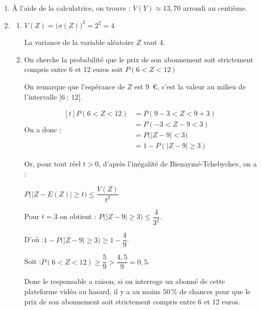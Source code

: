 \begin{enumerate}
\item À l'aide de la calculatrice, on trouve : $V(Y) \approx 13,70$ arrondi au centième.


\item
	\begin{enumerate}
		\item $V(Z) = \big(\sigma(Z)\big)^2= 2^2 =4$

La variance de la variable aléatoire $Z$ vaut 4.
		\item On cherche la probabilité que le prix de son abonnement soit strictement compris entre 6 et 12 euros soit $P(6 < Z <12)$

On remarque que l'espérance de $Z$ est $9$~\euro{}, c'est la valeur au milieu de l'intervalle $]6~;~12[$.

On a donc :\quad $\begin{aligned}[t]
	P(6 < Z <12)
	&= P(9-3<Z<9+3) \\
	&= P(-3 < Z-9 < 3)\\
	&= P\Big(\big|Z-9\big| < 3\Big)\\
	&= 1 - P(|Z-9|\geqslant 3)
\end{aligned}$

Or, pour tout réel $t > 0$, d'après l'inégalité de Bienaymé-Tchebychev, on a :

$P\Big(\big|Z-E(Z)\big| \geqslant t\Big) \leqslant \dfrac{V(Z)}{t^2}$

Pour $t = 3$ on obtient : \quad $ P\Big(\big|Z-9\big| \geqslant 3\Big)\leqslant \dfrac{4}{ 3^2}$.

D'où :\quad $1- P\Big(\big|Z-9\big| \geqslant 3\Big)\geqslant 1- \dfrac{4}{9}$.

Soit :\quad $P(6 <Z <12) \geqslant \dfrac{5}{9} > \dfrac{4,5}{9} = 0,5$.

Donc le responsable a raison, si on interroge un abonné de cette plateforme vidéo au hasard, il y a au moins $50\,\%$ de chances pour que le prix de son abonnement soit strictement compris entre 6 et 12 euros.
	\end{enumerate}
\end{enumerate}
